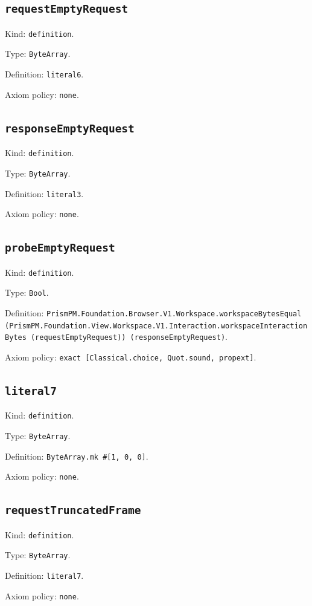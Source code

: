 \documentclass[11pt]{article}
\begin{document}
\subsection*{\texttt{requestEmptyRequest}}
\noindent Kind: \texttt{definition}.\par
\noindent Type: \texttt{ByteArray}.\par
\noindent Definition: \texttt{literal6}.\par
\noindent Axiom policy: \texttt{none}.\par
\subsection*{\texttt{responseEmptyRequest}}
\noindent Kind: \texttt{definition}.\par
\noindent Type: \texttt{ByteArray}.\par
\noindent Definition: \texttt{literal3}.\par
\noindent Axiom policy: \texttt{none}.\par
\subsection*{\texttt{probeEmptyRequest}}
\noindent Kind: \texttt{definition}.\par
\noindent Type: \texttt{Bool}.\par
\noindent Definition: \texttt{PrismPM.Foundation.Browser.V1.Workspace.workspaceBytesEqual (PrismPM.Foundation.View.Workspace.V1.Interaction.workspaceInteractionBytes (requestEmptyRequest)) (responseEmptyRequest)}.\par
\noindent Axiom policy: \texttt{exact [Classical.choice, Quot.sound, propext]}.\par
\subsection*{\texttt{literal7}}
\noindent Kind: \texttt{definition}.\par
\noindent Type: \texttt{ByteArray}.\par
\noindent Definition: \texttt{ByteArray.mk \#[1, 0, 0]}.\par
\noindent Axiom policy: \texttt{none}.\par
\subsection*{\texttt{requestTruncatedFrame}}
\noindent Kind: \texttt{definition}.\par
\noindent Type: \texttt{ByteArray}.\par
\noindent Definition: \texttt{literal7}.\par
\noindent Axiom policy: \texttt{none}.\par
\end{document}
